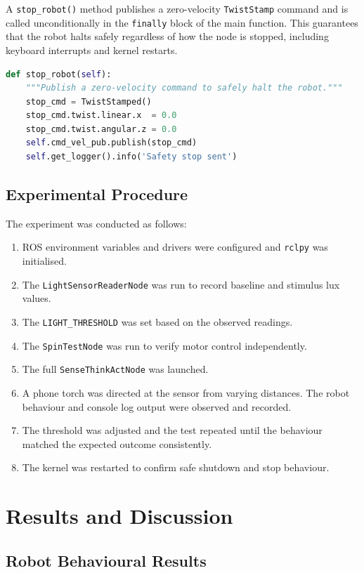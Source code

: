 \documentclass[11 pt , a 4 paper ]{article}
\theoremstyle{definition}
\begin{document}
A \texttt{stop\_robot()} method publishes a zero-velocity \texttt{TwistStamp} command and is called unconditionally in the \texttt{finally} block of the main function. This guarantees that the robot halts safely regardless of how the node is stopped, including keyboard interrupts and kernel restarts.
\begin{lstlisting}[language=python]
def stop_robot(self):
	"""Publish a zero-velocity command to safely halt the robot."""
	stop_cmd = TwistStamped()
	stop_cmd.twist.linear.x  = 0.0
	stop_cmd.twist.angular.z = 0.0
	self.cmd_vel_pub.publish(stop_cmd)
	self.get_logger().info('Safety stop sent')
\end{lstlisting}
\subsection{Experimental Procedure}
The experiment was conducted as follows:

\begin{enumerate}
	\item ROS environment variables and drivers were configured and \texttt{rclpy} was initialised.
	\item The \texttt{LightSensorReaderNode} was run to record baseline and stimulus lux values.
	\item The \texttt{LIGHT\_THRESHOLD} was set based on the observed readings.
	\item The \texttt{SpinTestNode} was run to verify motor control independently.
	\item The full \texttt{SenseThinkActNode} was launched.
	\item A phone torch was directed at the sensor from varying distances. The robot behaviour and console log output were observed and recorded.
	\item The threshold was adjusted and the test repeated until the behaviour matched the expected outcome consistently.
	\item The kernel was restarted to confirm safe shutdown and stop behaviour.
\end{enumerate}
\section{Results and Discussion}

\subsection{Robot Behavioural Results}
\end{document}
